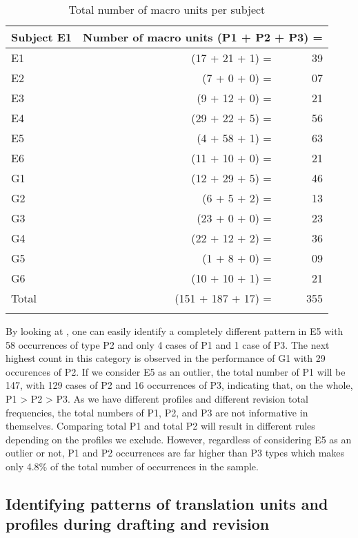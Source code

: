 \documentclass[output=paper]{LSP/langsci}
\begin{document}
\begin{table}
\begin{tabular}{lrr}
\lsptoprule

Subject  E1 & \multicolumn{2}{c}{ Number of macro units (P1 + P2 + P3) =}\\
 \midrule 
 E1 & (17 + 21 + 1) = & 39\\
 E2 & (7 + 0 + 0) = &  07\\
 E3 & (9 + 12 + 0) = &  21\\
 E4 &  (29 + 22 + 5) = &  56\\
 E5 &   (4 + 58 + 1) =  & 63\\
 E6 &  (11 + 10 + 0) =  & 21\\
 G1 &   (12 + 29 + 5) = &  46\\
 G2 &   (6 + 5 + 2) =  & 13\\
 G3 &  (23 + 0 + 0) =  & 23\\
 G4 &   (22 + 12 + 2) = &  36\\
 G5 &  (1 + 8 + 0) =  & 09\\
 G6 &  (10 + 10 + 1) =  & 21\\
 \midrule 
 Total &  (151 + 187 + 17) = &  355\\
\lspbottomrule
\end{tabular}
\caption{Total number of macro units per subject}
\label{tab:alves:1}
\end{table} 

By looking at , one can easily identify a completely different pattern in E5 with 58 occurrences of type P2 and only 4 cases of P1 and 1 case of P3. The next highest count in this category is observed in the performance of G1 with 29 occurences of P2. If we consider E5 as an outlier, the total number of P1 will be 147, with 129 cases of P2 and 16 occurrences of P3, indicating that, on the whole, P1 {\textgreater} P2 {\textgreater} P3. As we have different profiles and different revision total frequencies, the total numbers of P1, P2, and P3 are not informative in themselves. Comparing total P1 and total P2 will result in different rules depending on the profiles we exclude. However, regardless of considering E5 as an outlier or not, P1 and P2 occurrences are far higher than P3 types which makes only 4.8\% of the total number of occurrences in the sample.

\subsection{Identifying patterns of translation units and profiles during drafting and revision}\label{sec:alves:4.1}
\end{document}

